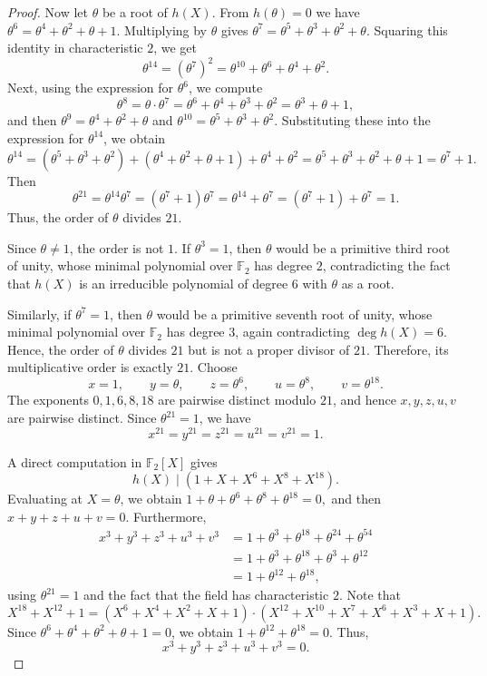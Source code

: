 \documentclass[12pt,draftcls,journal,onecolumn]{IEEEtran}
\begin{document}
\begin{proof}
Now let \(\theta\) be a root of \(h(X)\). From \(h(\theta)=0\) we have
$
\theta^6=\theta^4+\theta^2+\theta+1.
$
Multiplying by \(\theta\) gives
$
\theta^7=\theta^5+\theta^3+\theta^2+\theta.
$
Squaring this identity in characteristic \(2\), we get
\[
\theta^{14}=(\theta^7)^2
=\theta^{10}+\theta^6+\theta^4+\theta^2.
\]
Next, using the expression for \(\theta^6\), we compute
\[
\theta^8=\theta\cdot\theta^7
=\theta^6+\theta^4+\theta^3+\theta^2
=\theta^3+\theta+1,
\]
and then
$
\theta^9=\theta^4+\theta^2+\theta$ and
$
\theta^{10}=\theta^5+\theta^3+\theta^2.
$
Substituting these into the expression for \(\theta^{14}\), we obtain
\[
\theta^{14}
=(\theta^5+\theta^3+\theta^2)+(\theta^4+\theta^2+\theta+1)+\theta^4+\theta^2
=\theta^5+\theta^3+\theta^2+\theta+1
=\theta^7+1.
\]
Then
\[
\theta^{21}
=\theta^{14}\theta^7
=(\theta^7+1)\theta^7
=\theta^{14}+\theta^7
=(\theta^7+1)+\theta^7
=1.
\]
Thus, the order of \(\theta\) divides \(21\).

Since \(\theta\neq 1\), the order is not \(1\). If \(\theta^3=1\), then \(\theta\) would be a primitive third root of unity, whose minimal polynomial over \(\mathbb F_2\) has degree \(2\), contradicting the fact that \(h(X)\) is an irreducible polynomial of degree \(6\) with \(\theta\) as a root.

 Similarly, if \(\theta^7=1\), then \(\theta\) would be a primitive seventh root of unity, whose minimal polynomial over \(\mathbb F_2\) has degree \(3\), again contradicting \(\deg h(X)=6\). Hence, the order of \(\theta\) divides \(21\) but is not a proper divisor of \(21\). Therefore, its multiplicative order is exactly \(21\).
Choose
\[
x=1,\qquad
y=\theta,\qquad
z=\theta^6,\qquad
u=\theta^8,\qquad
v=\theta^{18}.
\]
The exponents
$
0,1,6,8,18
$
are pairwise distinct modulo $21$, and hence
$x,y,z,u,v$ are pairwise distinct. Since $\theta^{21}=1$, we have
\[
x^{21}=y^{21}=z^{21}=u^{21}=v^{21}=1.
\]

A direct computation in $\mathbb{F}_2[X]$ gives
\[
h(X)\mid
\left(1+X+X^6+X^8+X^{18}\right).
\]
Evaluating at $X=\theta$, we obtain
$
1+\theta+\theta^6+\theta^8+\theta^{18}=0,
$
and then
$
x+y+z+u+v=0.
$
Furthermore,
\[
\begin{aligned}
x^3+y^3+z^3+u^3+v^3
&=1+\theta^3+\theta^{18}+\theta^{24}+\theta^{54}\\
&=1+\theta^3+\theta^{18}+\theta^3+\theta^{12}\\
&=1+\theta^{12}+\theta^{18},
\end{aligned}
\]
using \(\theta^{21}=1\) and the fact that the field has characteristic \(2\). Note that
$$
 X^{18}+X^{12}+1 = \left(X^6+X^4+X^2+X+1\right)\cdot\left(X^{12}+X^{10}+X^7+X^6+X^3+X+1\right).
$$
Since $\theta^6+\theta^4+\theta^2+\theta+1=0$,  we obtain
$
1+\theta^{12}+\theta^{18}=0.
$
Thus,
\[
x^3+y^3+z^3+u^3+v^3=0.
\]


\end{proof}
\end{document}

